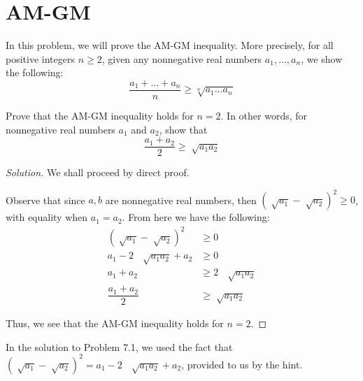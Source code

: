 \documentclass{article}
\newenvironment{solution}{\begin{proof}[Solution]}{\end{proof}}
\begin{document}
\section{AM-GM}
In this problem, we will prove the AM-GM inequality. More precisely, for all positive integers $n \geq 2$, given any nonnegative real numbers $a_{1}, \ldots, a_{n}$, we show the following:
\begin{equation*}
	\dfrac{a_{1} + \ldots + a_{n}}{n} \geq \sqrt[n]{a_{1} \ldots a_{n}}
\end{equation*}
\begin{hw}
	Prove that the AM-GM inequality holds for $n=2$. In other words, for nonnegative real numbers $a_{1}$ and $a_{2}$, show that
	\begin{equation*}
		\dfrac{a_{1} + a_{2}}{2} \geq \sqrt[]{a_1 a_{2}}
	\end{equation*}
\end{hw}
\begin{solution}
	We shall proceed by direct proof.
	
	Observe that since $a,b$ are nonnegative real numbers, then $\left( \sqrt[]{a_{1}} - \sqrt[]{a_{2}} \right)^{2} \geq 0$, with equality when $a_{1} = a_{2}$. From here we have the following:
	\begin{align*}
		\left( \sqrt[]{a_{1}} - \sqrt[]{a_{2}} \right)^{2} &\geq 0 \\
		a_{1} - 2\text{  }\sqrt[]{a_{1}a_{2}} + a_{2} &\geq 0 \\
		a_{1}+a_{2} &\geq 2\text{  }\sqrt[]{a_{1}a_{2}} \\
		\dfrac{a_{1}+a_{2}}{2} &\geq \sqrt[]{a_{1}a_{2}}
	\end{align*}

	Thus, we see that the AM-GM inequality holds for $n=2$. 
\end{solution}
\begin{rmk}
	In the solution to Problem 7.1, we used the fact that $\left( \sqrt[]{a_{1}} - \sqrt[]{a_{2}} \right)^{2} = a_{1}-2\text{  }\sqrt[]{a_1 a_{2}}+a_{2}$, provided to us by the hint.                 
\end{rmk}
\end{document}
